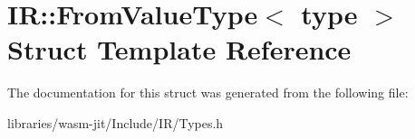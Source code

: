 \hypertarget{struct_i_r_1_1_from_value_type}{}\section{IR\+:\+:From\+Value\+Type$<$ type $>$ Struct Template Reference}
\label{struct_i_r_1_1_from_value_type}


The documentation for this struct was generated from the following file\+:\begin{DoxyCompactItemize}
\item 
libraries/wasm-\/jit/\+Include/\+I\+R/Types.\+h\end{DoxyCompactItemize}
